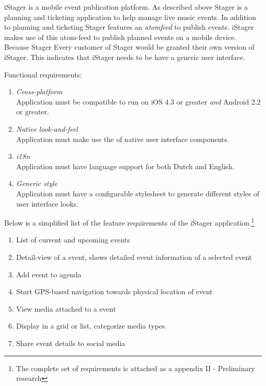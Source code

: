 iStager is a mobile event publication platform. As described above Stager is a planning and ticketing application to help manage live music events. In addition to planning and ticketing Stager features an \emph{atomfeed} to publish events. iStager makes use of this atom-feed to publish planned events on a mobile device. Because Stager
Every customer of Stager would be granted their own version of iStager. This indicates that iStager needs to be have a generic user interface.



Functional requirements:
\begin{enumerate}
\item \emph{Cross-platform}\\Application must be compatible to run on iOS 4.3 or greater \emph{and} Android 2.2 or greater.
\item \emph{Native look-and-feel}\\Application must make use the of native user interface components.
\item \emph{i18n}\\Application must have language support for both Dutch and English.
\item \emph{Generic style}\\Application must have a configurable stylesheet to generate different styles of user interface looks.
\end{enumerate}

\noindent Below is a simplified list of the feature requirements of the iStager application.\footnote{The complete set of requirements is attached as a appendix II - Preliminary research} %
\begin{enumerate}
\item
List of current and upcoming events
\item
Detail-view of a event, shows detailed event information of a selected event
\item
Add event to agenda
\item
Start GPS-based navigation towards physical location of event
\item
View media attached to a event
\item
Display in a grid or list, categorize media types.
\item
Share event details to social media
\end{enumerate}

